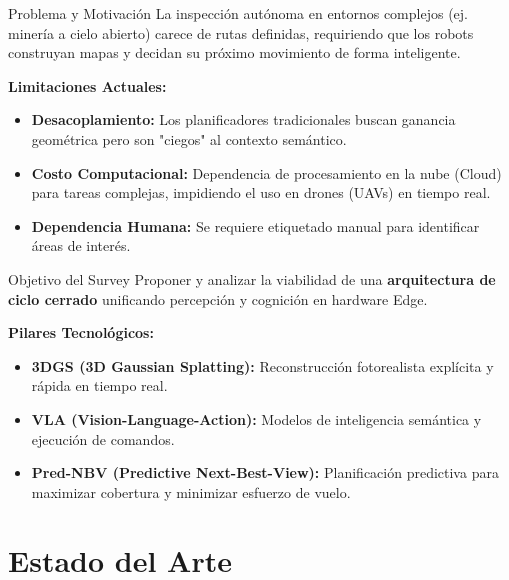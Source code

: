 \documentclass[aspectratio=169]{beamer}
\begin{document}
	\begin{frame}{Problema y Motivación}
		\justifying
		La inspección autónoma en entornos complejos (ej. minería a cielo abierto) carece de rutas definidas, requiriendo que los robots construyan mapas y decidan su próximo movimiento de forma inteligente.
		
		\vspace{1ex}
		\textbf{Limitaciones Actuales:}
		\begin{itemize}
			\item \textbf{Desacoplamiento:} Los planificadores tradicionales buscan ganancia geométrica pero son "ciegos" al contexto semántico.
			\item \textbf{Costo Computacional:} Dependencia de procesamiento en la nube (Cloud) para tareas complejas, impidiendo el uso en drones (UAVs) en tiempo real.
			\item \textbf{Dependencia Humana:} Se requiere etiquetado manual para identificar áreas de interés.
		\end{itemize}
	\end{frame}
	
	\begin{frame}{Objetivo del Survey}
		\justifying
		Proponer y analizar la viabilidad de una \textbf{arquitectura de ciclo cerrado} unificando percepción y cognición en hardware Edge.
		
		\vspace{1ex}
		\textbf{Pilares Tecnológicos:}
		\begin{itemize}
			\item \textbf{3DGS (3D Gaussian Splatting):} Reconstrucción fotorealista explícita y rápida en tiempo real.
			\item \textbf{VLA (Vision-Language-Action):} Modelos de inteligencia semántica y ejecución de comandos.
			\item \textbf{Pred-NBV (Predictive Next-Best-View):} Planificación predictiva para maximizar cobertura y minimizar esfuerzo de vuelo.
		\end{itemize}
	\end{frame}
	
	
	\section{Estado del Arte}
	
\end{document}
